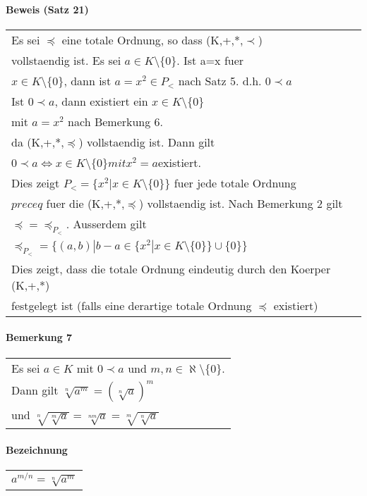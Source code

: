 \documentclass[a4paper]{scrartcl}
\begin{document}
\paragraph{Beweis (Satz 21)}
\begin{tabbing}
\begin{tabular}{l}
Es sei $\preceq$ eine totale Ordnung, so dass (K,+,*,$\prec$)\\
vollstaendig ist. Es sei $a\in K\setminus \{ 0\}$. Ist a=x fuer\\
$x\in K\setminus \{ 0\}$, dann ist $a=x^2 \in P_<$ nach Satz 5. d.h. $0\prec a$\\
Ist $0 \prec a$, dann existiert ein $x\in K\setminus \{ 0\}$ \\
mit $a=x^2$ nach Bemerkung 6.\\
da (K,+,*,$\preceq$) vollstaendig ist. Dann gilt \\
$0 \prec a \Leftrightarrow x \in K \setminus \{ 0\} mit x^2=a $existiert.\\
Dies zeigt $P_< = \{ x^2|x\in K\setminus \{ 0\} \}$ fuer jede totale Ordnung\\
$preceq$ fuer die (K,+,*,$\preceq$) vollstaendig ist. Nach Bemerkung 2 gilt\\
$ \preceq = \preceq_{P_<} $. Ausserdem gilt \\
$\preceq_{P_<} = \{ (a,b)|b-a \in \{ x^2|x \in K\setminus \{ 0\} \}\cup \{ 0\} \}$\\
Dies zeigt, dass die totale Ordnung eindeutig durch den Koerper (K,+,*)\\
festgelegt ist (falls eine derartige totale Ordnung $\preceq$ existiert)
\end{tabular}
\end{tabbing}

\paragraph{Bemerkung 7}
\begin{tabbing}
\begin{tabular}{l}
Es sei $a\in K$ mit $0 \prec a$ und $m,n\in \aleph \setminus \{ 0\}$.\\
Dann gilt $\sqrt[n]{a^m} = (\sqrt[n]{a})^m$\\
und $\sqrt[n]{\sqrt[m]{a}}=\sqrt[nm]{a}=\sqrt[m]{\sqrt[n]{a}}$
\end{tabular}
\end{tabbing}

\paragraph{Bezeichnung}
\begin{tabbing}
\begin{tabular}{l}
$a^{m/n} = \sqrt[n]{a^m}$
\end{tabular}
\end{tabbing}
\end{document}
